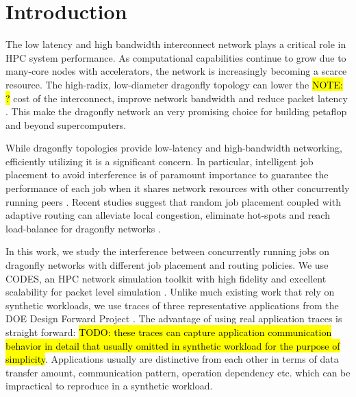 \documentclass[conference,compsoc]{IEEEtran}
\newcommand{\TODO}[1]{\hl{TODO: #1}}
\newcommand{\NOTE}[1]{\hl {NOTE: #1}}
\begin{document}




%
\IEEEpeerreviewmaketitle



\section{Introduction}
\label{sec:intro}

The low latency and high bandwidth interconnect network plays a critical role in HPC system performance. As computational capabilities continue to grow due to many-core nodes with accelerators, the network is increasingly becoming a scarce resource. The high-radix, low-diameter dragonfly topology can lower the \NOTE{?} cost of the interconnect, improve network bandwidth and reduce packet latency \cite{dally-dragonfly}. This make the dragonfly network an very promising choice for building petaflop and beyond supercomputers. 


While dragonfly topologies provide low-latency and high-bandwidth networking, efficiently utilizing it is a significant concern. In particular, intelligent job placement to avoid interference is of paramount importance to guarantee the performance of each job when it shares network resources with other concurrently running peers \cite{bhatele2015, dskinner}. Recent studies suggest that random job placement coupled with adaptive routing can alleviate local congestion, eliminate hot-spots and reach load-balance for dragonfly networks \cite{jain-sc14, bhatele-sc11, brandt2014}. 


In this work, we study the interference between concurrently running jobs on dragonfly networks with different job placement and routing policies. We use CODES, an HPC network simulation toolkit with high fidelity and excellent scalability for packet level simulation \cite{codes}. Unlike much existing work that rely on synthetic workloads, we use traces of three representative applications from the DOE Design Forward Project \cite{designforwardwebpage}. The advantage of using real application traces is straight forward: \TODO{ these traces can capture application communication behavior in detail that usually omitted in synthetic workload for the purpose of simplicity}. Applications usually are distinctive from each other in terms of data transfer amount, communication pattern, operation dependency etc. which can be impractical to reproduce in a synthetic workload.
\end{document}
